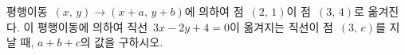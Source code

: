 평행이동~$(x,\,y)\longrightarrow(x+a,\,y+b)$에 의하여 점~$(2,\,1)$이 점~$(3,\,4)$로 옮겨진다. 이 평행이동에 의하여 직선~$3x-2y+4=0$이 옮겨지는 직선이 점~$(3,\,c)$를 지날 때, $a+b+c$의 값을 구하시오.
